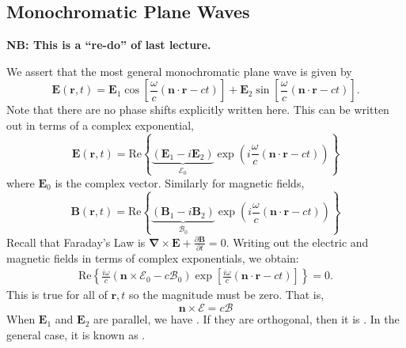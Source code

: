 \documentclass{article}
\numberwithin{equation}{section}
\begin{document}
\subsection{Monochromatic Plane Waves}
\textbf{NB: This is a ``re-do'' of last lecture.}

We assert that the most general monochromatic plane wave is given by
\begin{equation}
    \bm{E}(\bm{r},t) = \bm{E}_1 \cos\left[\frac{\omega}{c}(\bm{n}\cdot \bm{r} - ct)\right] + \bm{E}_2 \sin\left[\frac{\omega}{c}\left(\bm{n}\cdot\bm{r} - ct\right)\right].
\end{equation}
Note that there are no phase shifts explicitly written here. This can be written out in terms of a complex exponential,
\begin{equation}
    \bm{E}(\bm{r},t) = \text{Re}\left\{\underbrace{(\bm{E}_1-i\bm{E}_2)}_{\mathcal{E}_0}\exp\left(i\frac{\omega}{c}(\bm{n}\cdot \bm{r} - ct)\right)\right\}
\end{equation}
where $\bm{E}_0$ is the complex vector. Similarly for magnetic fields,
\begin{equation}
    \bm{B}(\bm{r},t) = \text{Re}\left\{\underbrace{(\bm{B}_1-i\bm{B}_2)}_{\mathcal{B}_0}\exp\left(i\frac{\omega}{c}(\bm{n}\cdot \bm{r} - ct)\right)\right\}
\end{equation}
Recall that Faraday's Law is $\bm{\nabla} \times \bm{E} + \frac{\partial\bm{B}}{\partial t} = 0.$ Writing out the electric and magnetic fields in terms of complex exponentials, we obtain:
\begin{align}
    \text{Re}\left\{\frac{i\omega}{c}\left(\bm{n}\times \bm{\mathcal{E}}_0 - c\bm{\mathcal{B}}_0\right)\exp\left[\frac{i\omega}{c}\left(\bm{n}\cdot \bm{r} - ct\right)\right]\right\} = 0.
\end{align}
This is true for all of $\bm{r},t$ so the magnitude must be zero. That is,
\begin{equation}
    \bm{n} \times \bm{\mathcal{E}} = c\bm{\mathcal{B}}
\end{equation}
When $\bm{E}_1$ and $\bm{E}_2$ are parallel, we have . If they are orthogonal, then it is . In the general case, it is known as .
\end{document}
